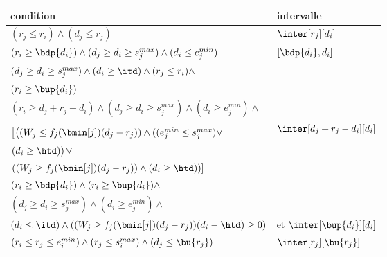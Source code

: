 \documentclass{report}
\begin{document}
\begin{tabular}{|p{12cm}|p{6cm}	|}
\hline
\rule[-0.5cm]{0cm}{1.5cm}
condition & intervalle\\
\hline
$(r_j \le r_i) \land (d_j \le r_j)$ 
& 
\rule[-0.5cm]{0cm}{1.3cm}
$\inter[r_j][d_i]$\\

$\left(r_i \ge \bdp{d_i} \right) 
\land (d_j \ge d_i \ge s_j^{max})
\land (d_i \le e_j^{min})$ 
& 
\rule[-0.5cm]{0cm}{1.3cm}
$\left[\bdp{d_i},d_i \right]$\\


$(d_j \ge d_i \ge s_j^{max}) \land 
\left(d_i \ge \itd \right) \land
(r_j \le r_i) \land $
&
\rule[-0.5cm]{0cm}{1.3cm}
\multirow{2}{*}{$\inter[r_j][d_i]$ et $\left[\bup{d_i},d_i\right]$}\\
$\left(r_i \ge \bup{d_i} \right)$
& \\

\rule[-0.5cm]{0cm}{1.3cm}
$(r_i \ge d_j+r_j-d_i) \land (d_j \ge d_i \ge s_j^{max}) \land
(d_i \ge e_j^{min}) \land$\\
&
\multirow{4}{*}{$\inter[d_j+r_j-d_i][d_i]$}\\
$\left[ 
\left( (W_j \le f_j(\bmin[j])(d_j-r_j)) \land 
( (e_j^{min} \le s_j^{max}) \lor \right. \right.$ & \\
$\left. (d_i \ge \htd) \right) \lor $ & \\
$\left. \left( (W_j \ge f_j(\bmin[j])(d_j-r_j)) \land (d_i \ge \htd) \right) 
\right]$ & \\


$(r_i \ge \bdp{d_i}) \land 
(r_i \ge \bup{d_i}) \land$ 
&
\rule[-0.5cm]{0cm}{1.3cm}
\multirow{2}{*}{$\inter[\bdp{d_i}][d_i]$}\\
$(d_j \ge d_i \ge s_j^{max}) \land
(d_i \ge e_j^{min}) \land$ & \\
$(d_i \le \itd) \land
((W_j \ge f_j(\bmin[j])(d_j-r_j))(d_i - \htd) \ge 0)$ & et $\inter[\bup{d_i}][d_i]$\\

$(r_i \le r_j \le e_i^{min}) \land
(r_j \le s_i^{max}) \land
(d_j \le \bu{r_j})$
&
$\inter[r_j][\bu{r_j}]$\\


\hline
\end{tabular}
\end{document}
